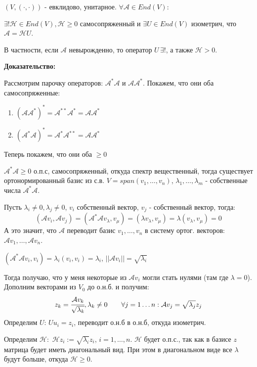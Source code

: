 $(V, (\cdot,\cdot))$ - евклидово, унитарное. $\forall \mathcal{A} \in End(V):$

$\exists! \mathcal{H} \in End(V), \mathcal{H}\geq 0$ самосопряженный и $\exists U \in End(V)$ изометрич, что $\mathcal{A} = \mathcal{H}U$.

В частности, если $\mathcal{A}$ невырожденно, то оператор $U \, \exists!$, а также $\mathcal{H} >0$.

\textbf{Доказательство:}

Рассмотрим парочку операторов: $\mathcal{A}^* \mathcal{A}$ и $\mathcal{A}\mathcal{A}^*$. Покажем, что они оба самосопряженные:
\begin{enumerate}
    \item $(\mathcal{A}\mathcal{A}^*)^* = \mathcal{A}^{**}\mathcal{A}^* = \mathcal{A}\mathcal{A}^*$
     \item $(\mathcal{A}^*\mathcal{A})^* = \mathcal{A}^{*}\mathcal{A}^{**} = \mathcal{A}\mathcal{A}^*$
\end{enumerate}
Теперь покажем, что они оба $\geq 0$ %

$\mathcal{A}^*\mathcal{A} \geq 0$ о.п.с, самосопряженный, откуда спектр вещественный, тогда существует ортонормированный базис из с.в. $V  =span(v_1,\ldots,v_n)$, $\lambda_1,\ldots,\lambda_m$ - собственные числа  $\mathcal{A}^*\mathcal{A}$.


Пусть $\lambda_i \neq 0, \lambda_j \neq 0$, $v_i$ собственный вектор, $v_j$ - собственный вектор, тогда:
$$(\mathcal{A} v_i, \mathcal{A}v_j)=(\mathcal{A}^* \mathcal{A} v_\lambda , v_\mu) = (\lambda v_\lambda,v_\mu) = \lambda (v_\lambda, v_\mu) = 0$$
А это значит, что $\mathcal{A}$ переводит базис $v_1,\ldots, v_n$ в систему ортог. векторов: $\mathcal{A}v_1,\ldots, \mathcal{A}v_n$.

$(\mathcal{A}^*\mathcal{A}v_i,v_i) = \lambda_i (v_i,v_i) = \lambda_i$, $||\mathcal{A}v_i|| = \sqrt{\lambda_i}$

Тогда получаю, что у меня некоторые из $\mathcal{A}v_i$ могли стать нулями (там где $\lambda = 0$). Дополним векторами из $V_0$ до о.н.б. и получим:
$$ z_k = \cfrac{\mathcal{A}v_k}{\sqrt{\lambda_k}}, \lambda_k \neq 0 \quad \quad 
\forall j = 1\ldots n: \mathcal{A}v_j = \sqrt{\lambda_j} z_j$$
Определим $U$: $U u_i = z_i$, переводит о.н.б в о.н.б, откуда изометрич.

Определим $\mathcal{H}:$ $\mathcal{H}z_i := \sqrt{\lambda_i}z_i$, $i = 1,\ldots, n$.  $\mathcal{H}$ будет о.п.с., так как в базисе $z$ матрица будет иметь диагональный вид. При этом в диагональном виде все $\lambda$ будут больше, откуда $\mathcal{H}\geq 0$.


